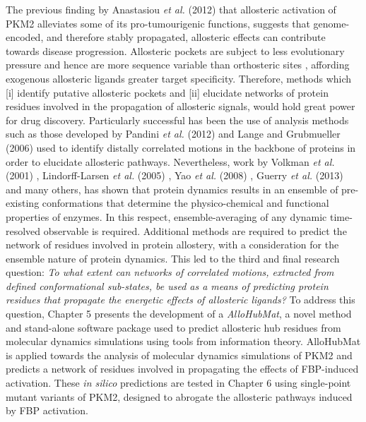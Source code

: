 %
%
The previous finding by Anastasiou \textit{et al.} (2012) \cite{Anastasiou:2012aa} that allosteric activation of PKM2 alleviates some of its pro-tumourigenic functions, suggests that genome-encoded, and therefore stably propagated, allosteric effects can contribute towards disease progression. Allosteric pockets are subject to less evolutionary pressure and hence are more sequence variable than orthosteric sites \cite{Yang:2012aa}, affording exogenous allosteric ligands greater target specificity. Therefore, methods which [i] identify putative allosteric pockets and [ii] elucidate networks of protein residues involved in the propagation of allosteric signals, would hold great power for drug discovery. Particularly successful has been the use of analysis methods such as those developed by Pandini \textit{et al.} (2012) \cite{Pandini:2012aa} and Lange and Grubmueller (2006) \cite{Lange:2006aa} used to identify distally correlated 	motions in the backbone of proteins in order to elucidate allosteric pathways. Nevertheless, work by Volkman \textit{et al.} (2001) \cite{Volkman:2001aa}, Lindorff-Larsen \textit{et al.} (2005) \cite{Lindorff-Larsen:2005aa}, Yao \textit{et al.} (2008) \cite{Yao:2008aa}, Guerry \textit{et al.} (2013) \cite{Guerry:2013aa} and many others, has shown that protein dynamics results in an ensemble of pre-existing conformations that determine the physico-chemical and functional properties of enzymes. In this respect, ensemble-averaging of any dynamic time-resolved observable is required. Additional methods are required to predict the network of residues involved in protein allostery, with a consideration for the ensemble nature of protein dynamics. This led to the third and final research question: \textit{To what extent can networks of correlated motions, extracted from defined conformational sub-states, be used as a means of predicting protein residues that propagate the energetic effects of allosteric ligands?} To address this question, Chapter 5 presents the development of a \textit{AlloHubMat}, a novel method and stand-alone software package used to predict allosteric hub residues from molecular dynamics simulations using tools from information theory. AlloHubMat is applied towards the analysis of molecular dynamics simulations of PKM2 and predicts a network of residues involved in propagating the effects of FBP-induced activation. These \textit{in silico} predictions are tested in Chapter 6 using single-point mutant variants of PKM2, designed to abrogate the allosteric pathways induced by FBP activation.
%
%
\\\\
